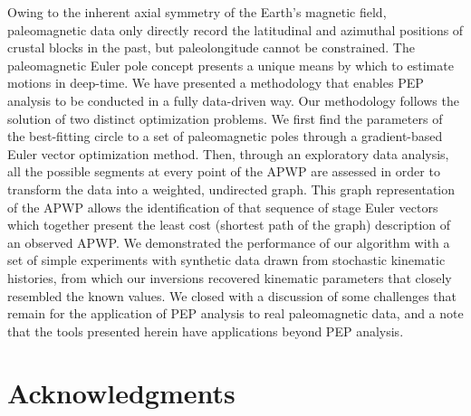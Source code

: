 \documentclass{article} %
\begin{document}
Owing to the inherent axial symmetry of the Earth’s magnetic field, paleomagnetic data only directly record the latitudinal and azimuthal positions of crustal blocks in the past, but paleolongitude cannot be constrained. The paleomagnetic Euler pole concept presents a unique means by which to estimate motions in deep-time. We have presented a methodology that enables PEP analysis to be conducted in a fully data-driven way. Our methodology follows the solution of two distinct optimization problems. We first find the parameters of the best-fitting circle to a set of paleomagnetic poles through a gradient-based Euler vector optimization method. Then, through an exploratory data analysis, all the possible segments at every point of the APWP are assessed in order to transform the data into a weighted, undirected graph. This graph representation of the APWP allows the identification of that sequence of stage Euler vectors which together present the least cost (shortest path of the graph) description of an observed APWP. We demonstrated the performance of our algorithm with a set of simple experiments with synthetic data drawn from stochastic kinematic histories, from which our inversions recovered kinematic parameters that closely resembled the known values. We closed with a discussion of some challenges that remain for the application of PEP analysis to real paleomagnetic data, and a note that the tools presented herein have applications beyond PEP analysis.


\section{Acknowledgments}
\end{document}
